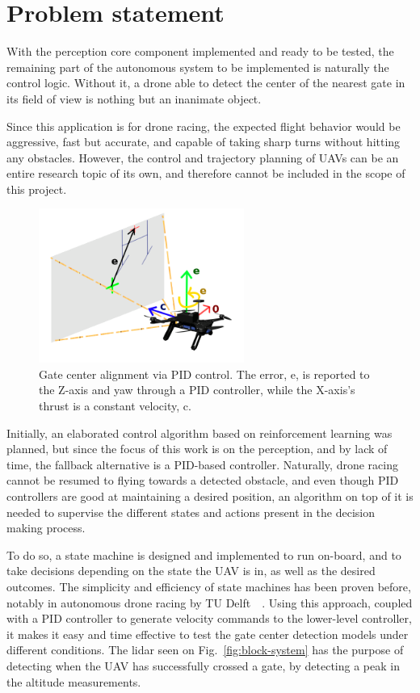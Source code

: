 \section{Problem statement}

With the perception core component implemented and ready to be tested, the
remaining part of the autonomous system to be implemented is naturally the
control logic. Without it, a drone able to detect the center of the nearest
gate in its field of view is nothing but an inanimate object.

Since this application is for drone racing, the expected flight behavior would
be aggressive, fast but accurate, and capable of taking sharp turns without
hitting any obstacles. However, the control and trajectory planning of UAVs can
be an entire research topic of its own, and therefore cannot be included in the
scope of this project.\\

\begin{figure}[h]
	\centering
	\includegraphics[width=0.6\textwidth]{figure/center_alignment.png}
	\caption[Gate center alignment via PID control.]{Gate center alignment via
	PID control. The error, e, is reported to the Z-axis and yaw through a PID
	controller, while the X-axis's thrust is a constant velocity, c.}
\end{figure}

Initially, an elaborated control algorithm based on reinforcement learning was
planned, but since the focus of this work is on the perception, and by lack of
time, the fallback alternative is a PID-based controller. Naturally, drone
racing cannot be resumed to flying towards a detected obstacle, and even though
PID controllers are good at maintaining a desired position, an algorithm on top
of it is needed to supervise the different states and actions present in the
decision making process.

To do so, a state machine is designed and implemented to run on-board, and to
take decisions depending on the state the UAV is in, as well as the desired
outcomes. The simplicity and efficiency of state machines has been proven
before, notably in autonomous drone racing by TU Delft~\etal~\cite{Moon}.
Using this approach, coupled with a PID controller to generate velocity
commands to the lower-level controller, it makes it easy and time effective to
test the gate center detection models under different conditions. The lidar
seen on Fig.~\ref{fig:block-system} has the purpose of detecting when the
UAV has successfully crossed a gate, by detecting a peak in the altitude
measurements.\\

